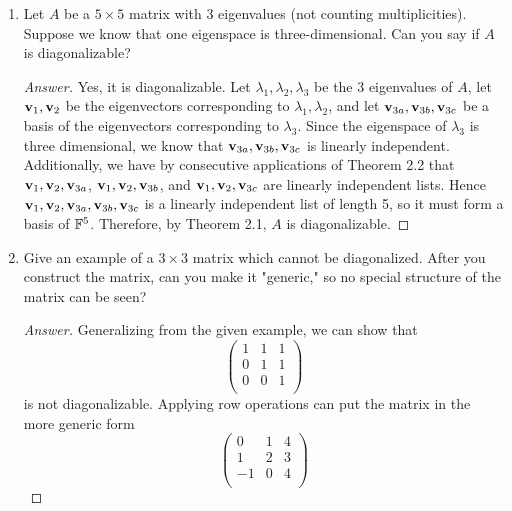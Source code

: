 \documentclass[../psets.tex]{subfiles}
\begin{document}
\begin{enumerate}[label={\textbf{2.\arabic*.}}]
    \item Let $A$ be a $5\times 5$ matrix with 3 eigenvalues (not counting multiplicities). Suppose we know that one eigenspace is three-dimensional. Can you say if $A$ is diagonalizable?
    \begin{proof}[Answer]
        Yes, it is diagonalizable. Let $\lambda_1,\lambda_2,\lambda_3$ be the 3 eigenvalues of $A$, let $\mathbf{v}_1,\mathbf{v}_2$ be the eigenvectors corresponding to $\lambda_1,\lambda_2$, and let $\mathbf{v}_{3a},\mathbf{v}_{3b},\mathbf{v}_{3c}$ be a basis of the eigenvectors corresponding to $\lambda_3$. Since the eigenspace of $\lambda_3$ is three dimensional, we know that $\mathbf{v}_{3a},\mathbf{v}_{3b},\mathbf{v}_{3c}$ is linearly independent. Additionally, we have by consecutive applications of Theorem 2.2 that $\mathbf{v}_1,\mathbf{v}_2,\mathbf{v}_{3a}$, $\mathbf{v}_1,\mathbf{v}_2,\mathbf{v}_{3b}$, and $\mathbf{v}_1,\mathbf{v}_2,\mathbf{v}_{3c}$ are linearly independent lists. Hence $\mathbf{v}_1,\mathbf{v}_2,\mathbf{v}_{3a},\mathbf{v}_{3b},\mathbf{v}_{3c}$ is a linearly independent list of length 5, so it must form a basis of $\mathbb{F}^5$. Therefore, by Theorem 2.1, $A$ is diagonalizable.
    \end{proof}
    \item Give an example of a $3\times 3$ matrix which cannot be diagonalized. After you construct the matrix, can you make it "generic," so no special structure of the matrix can be seen?
    \begin{proof}[Answer]
        Generalizing from the given example, we can show that
        \begin{equation*}
            \begin{pmatrix}
                1 & 1 & 1\\
                0 & 1 & 1\\
                0 & 0 & 1\\
            \end{pmatrix}
        \end{equation*}
        is not diagonalizable. Applying row operations can put the matrix in the more generic form
        \begin{equation*}
            \begin{pmatrix}
                0 & 1 & 4\\
                1 & 2 & 3\\
                -1 & 0 & 4\\
            \end{pmatrix}
        \end{equation*}
    \end{proof}

\end{enumerate}
\end{document}
